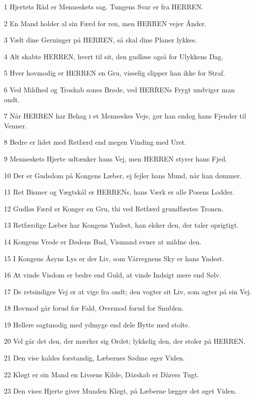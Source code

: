 \par 1 Hjertets Råd er Menneskets sag. Tungens Svar er fra HERREN.
\par 2 En Mand holder al sin Færd for ren, men HERREN vejer Ånder.
\par 3 Vælt dine Gerninger på HERREN, så skal dine Planer lykkes.
\par 4 Alt skabte HERREN, hvert til sit, den gudløse også for Ulykkens Dag.
\par 5 Hver hovmodig er HERREN en Gru, visselig slipper han ikke for Straf.
\par 6 Ved Mildhed og Troskab sones Brøde, ved HERRENs Frygt undviger man ondt.
\par 7 Når HERREN har Behag i et Menneskes Veje, gør han endog hans Fjender til Venner.
\par 8 Bedre er lidet med Retfærd end megen Vinding med Uret.
\par 9 Menneskets Hjerte udtænker hans Vej, men HERREN styrer hans Fjed.
\par 10 Der er Gudsdom på Kongens Læber, ej fejler hans Mund, når han dømmer.
\par 11 Ret Bismer og Vægtskål er HERRENs, hans Værk er alle Posens Lodder.
\par 12 Gudløs Færd er Konger en Gru, thi ved Retfærd grundfæstes Tronen.
\par 13 Retfærdige Læber har Kongens Yndest, han elsker den, der taler oprigtigt.
\par 14 Kongens Vrede er Dødens Bud, Vismand evner at mildne den.
\par 15 I Kongens Åsyns Lys er der Liv, som Vårregnens Sky er hans Yndest.
\par 16 At vinde Visdom er bedre end Guld, at vinde Indsigt mere end Sølv.
\par 17 De retsindiges Vej er at vige fra ondt; den vogter sit Liv, som agter på sin Vej.
\par 18 Hovmod går forud for Fald, Overmod forud for Snublen.
\par 19 Hellere sagtmodig med ydmyge end dele Bytte med stolte.
\par 20 Vel går det den, der mærker sig Ordet; lykkelig den, der stoler på HERREN.
\par 21 Den vise kaldes forstandig, Læbernes Sødme øger Viden.
\par 22 Kløgt er sin Mand en Livsens Kilde, Dårskab er Dårers Tugt.
\par 23 Den vises Hjerte giver Munden Kløgt, på Læberne lægger det øget Viden.
